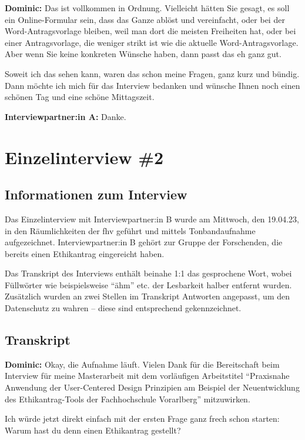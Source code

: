 \documentclass[a4paper,12pt,twoside]{scrreprt}
\begin{document}
\textbf{Dominic:} Das ist vollkommen in Ordnung. Vielleicht hätten Sie gesagt, es soll ein Online-Formular sein, dass das Ganze ablöst und vereinfacht, oder bei der Word-Antragsvorlage bleiben, weil man dort die meisten Freiheiten hat, oder bei einer Antragsvorlage, die weniger strikt ist wie die aktuelle Word-Antragsvorlage. Aber wenn Sie keine konkreten Wünsche haben, dann passt das eh ganz gut. 

Soweit ich das sehen kann, waren das schon meine Fragen, ganz kurz und bündig. Dann möchte ich mich für das Interview bedanken und wünsche Ihnen noch einen schönen Tag und eine schöne Mittagszeit.

\textbf{Interviewpartner:in A:} Danke.

\cleardoublepage
\chapter{Einzelinterview \#2}
\label{appendix:interview-2}

\section{Informationen zum Interview}
\label{appendix:interview-2-infos}

Das Einzelinterview mit Interviewpartner:in B wurde am Mittwoch, den 19.04.23, in den Räumlichkeiten der \ac{fhv} geführt und mittels Tonbandaufnahme aufgezeichnet. Interviewpartner:in B gehört zur Gruppe der Forschenden, die bereits einen Ethikantrag eingereicht haben.

Das Transkript des Interviews enthält beinahe 1:1 das gesprochene Wort, wobei Füllwörter wie beispielsweise \enquote{ähm} etc. der Lesbarkeit halber entfernt wurden. Zusätzlich wurden an zwei Stellen im Transkript Antworten angepasst, um den Datenschutz zu wahren -- diese sind entsprechend gekennzeichnet.

\section{Transkript}
\label{appendix:interview-2-transkript}

\textbf{Dominic:} Okay, die Aufnahme läuft. Vielen Dank für die Bereitschaft beim Interview für meine Masterarbeit mit dem vorläufigen Arbeitstitel \enquote{Praxisnahe Anwendung der User-Centered Design Prinzipien am Beispiel der Neuentwicklung des Ethikantrag-Tools der Fachhochschule Vorarlberg} mitzuwirken.

Ich würde jetzt direkt einfach mit der ersten Frage ganz frech schon starten: Warum hast du denn einen Ethikantrag gestellt?
\end{document}
